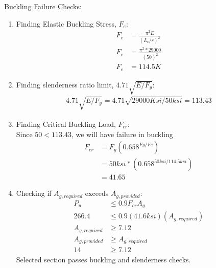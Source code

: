 \documentclass{report} %
\begin{document}
Buckling Failure Checks:
\begin{enumerate}
    \item Finding Elastic Buckling Stress, $F_e$:
        \begin{equation*}
            \begin{aligned}
                F_e &= \frac{\pi^2E}{(L_c/r)^2} \\
                F_e &= \frac{\pi^2*29000}{(50)^2} \\
                F_e &= 114.5K
            \end{aligned}
        \end{equation*}
    \item Finding slenderness ratio limit, $4.71\sqrt{E/F_y}$:
        \begin{equation*}
            \begin{aligned}
                4.71\sqrt{E/F_y} = 4.71\sqrt{29000Ksi/50ksi} = 113.43 
            \end{aligned}
        \end{equation*}
    \item Finding Critical Buckling Load, $F_{cr}$: \\
        Since $50 < 113.43$, we will have failure in buckling 
        \begin{equation*}
            \begin{aligned}
                F_{cr} &= F_y(0.658^{Fy/Fe}) \\
                        &= 50ksi * (0.658^{50ksi/114.5ksi}) \\
                        &= 41.65
            \end{aligned}
        \end{equation*}
    \item Checking if $A_{g,required}$ exceeds $A_{g,provided}$:
        \begin{equation*}
            \begin{aligned}
                P_u &\leq 0.9F_{cr}A_g \\
                266.4 &\leq 0.9(41.6ksi)(A_{g,required}) \\
                A_{g,required} &\geq 7.12 \\
                A_{g,provided} &\geq A_{g,required} \\
                14 &\geq 7.12 
            \end{aligned}
        \end{equation*}
        Selected section passes buckling and slenderness checks.
\end{enumerate}
\end{document}
